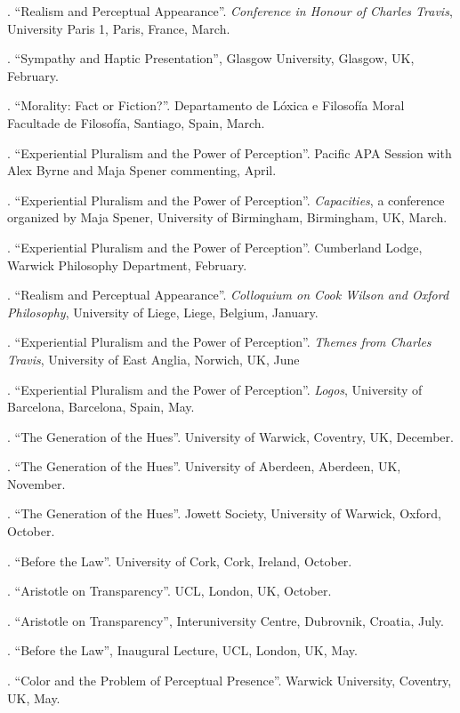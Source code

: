 \documentclass[11pt]{article}
\begin{document}
. ``Realism and Perceptual Appearance''. \emph{Conference in Honour of Charles Travis}, University Paris 1, Paris, France, March.

. ``Sympathy and Haptic Presentation'', Glasgow University, Glasgow, UK, February.

. ``Morality: Fact or Fiction?''. Departamento de Lóxica e Filosofía Moral
Facultade de Filosofía, Santiago, Spain, March.

. ``Experiential Pluralism and the Power of Perception''. Pacific APA Session with Alex Byrne and Maja Spener commenting, April.

. ``Experiential Pluralism and the Power of Perception''. \emph{Capacities}, a conference organized by Maja Spener, University of Birmingham, Birmingham, UK, March.

. ``Experiential Pluralism and the Power of Perception''. Cumberland Lodge, Warwick Philosophy Department, February.

. ``Realism and Perceptual Appearance''. \emph{Colloquium on Cook Wilson and Oxford Philosophy}, University of Liege, Liege, Belgium, January.

. ``Experiential Pluralism and the Power of Perception''. \emph{Themes from Charles Travis}, University of East Anglia, Norwich, UK, June

. ``Experiential Pluralism and the Power of Perception''. \emph{Logos}, University of Barcelona, Barcelona, Spain, May.

. ``The Generation of the Hues''. University of Warwick, Coventry, UK, December.

. ``The Generation of the Hues''. University of Aberdeen, Aberdeen, UK, November.

. ``The Generation of the Hues''. Jowett Society, University of Warwick, Oxford, October.

. ``Before the Law''. University of Cork, Cork, Ireland, October.

. ``Aristotle on Transparency''. UCL, London, UK, October.

. ``Aristotle on Transparency'', Interuniversity Centre, Dubrovnik, Croatia, July.

. ``Before the Law'', Inaugural Lecture, UCL, London, UK, May.

.  ``Color and the Problem of Perceptual Presence''. Warwick University, Coventry, UK, May.
\end{document}
